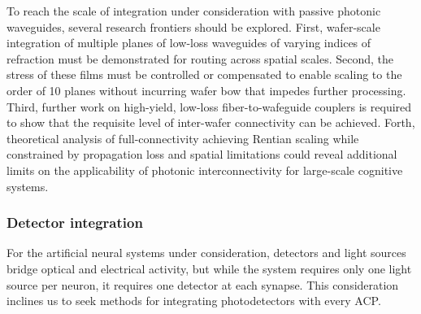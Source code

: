 \documentclass[twocolumn]{article}
\begin{document}
To reach the scale of integration under consideration with passive photonic waveguides, several research frontiers should be explored. First, wafer-scale integration of multiple planes of low-loss waveguides of varying indices of refraction must be demonstrated for routing across spatial scales. Second, the stress of these films must be controlled or compensated to enable scaling to the order of 10 planes without incurring wafer bow that impedes further processing. Third, further work on high-yield, low-loss fiber-to-wafeguide couplers is required to show that the requisite level of inter-wafer connectivity can be achieved. Forth, theoretical analysis of full-connectivity achieving Rentian scaling while constrained by propagation loss and spatial limitations could reveal additional limits on the applicability of photonic interconnectivity for large-scale cognitive systems.

\subsubsection{Detector integration}
For the artificial neural systems under consideration, detectors and light sources bridge optical and electrical activity, but while the system requires only one light source per neuron, it requires one detector at each synapse. This consideration inclines us to seek methods for integrating photodetectors with every ACP.
\end{document}
